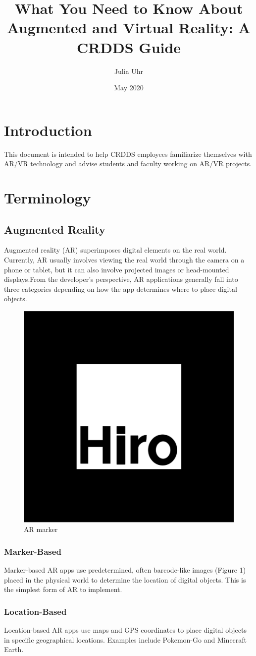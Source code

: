 \documentclass{article}
\title{What You Need to Know About Augmented and Virtual Reality: A CRDDS Guide}
\author{Julia Uhr}
\date{May 2020}
\begin{document}
\maketitle
\tableofcontents

\section{Introduction}
This document is intended to help CRDDS employees familiarize themselves with AR/VR technology and advise students and faculty working on AR/VR projects.

\section{Terminology}
\subsection{Augmented Reality}
Augmented reality (AR) superimposes digital elements on the real world. Currently, AR usually involves viewing the real world through the camera on a phone or tablet, but it can also involve projected images or head-mounted displays.From the developer's perspective, AR applications generally fall into three categories depending on how the app determines where to place digital objects.\\

\begin{figure}
\centering
\includegraphics[width=.3\textwidth]{hiro}
\caption{AR marker}
\end{figure}

\subsubsection{Marker-Based} Marker-based AR apps use predetermined, often barcode-like images (Figure 1) placed in the physical world to determine the location of digital objects. This is the simplest form of AR to implement.\\

\subsubsection{Location-Based} Location-based AR apps use maps and GPS coordinates to place digital objects in specific geographical locations. Examples include Pokemon-Go and Minecraft Earth.\\
\end{document}
